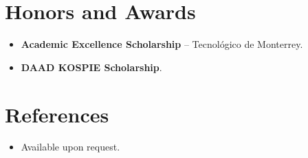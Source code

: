 \documentclass[11pt,a4paper,sans]{moderncv}
\begin{document}
\section{Honors and Awards}
\vspace{1pt}
\begin{itemize}
\item{\textbf{Academic Excellence Scholarship} -- Tecnológico de Monterrey.}
\item{\textbf{DAAD KOSPIE Scholarship}.}
\end{itemize}


\section{References}
\vspace{1pt}
\begin{itemize}
\item{Available upon request.}
\end{itemize}
\end{document}
